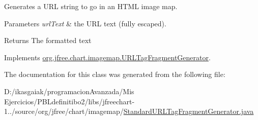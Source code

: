 Generates a U\+RL string to go in an H\+T\+ML image map.


\begin{DoxyParams}{Parameters}
{\em url\+Text} & the U\+RL text (fully escaped).\\
\hline
\end{DoxyParams}
\begin{DoxyReturn}{Returns}
The formatted text 
\end{DoxyReturn}


Implements \mbox{\hyperlink{interfaceorg_1_1jfree_1_1chart_1_1imagemap_1_1_u_r_l_tag_fragment_generator_aa69913b2f18cfa63c5641c0b10cb66bc}{org.\+jfree.\+chart.\+imagemap.\+U\+R\+L\+Tag\+Fragment\+Generator}}.



The documentation for this class was generated from the following file\+:\begin{DoxyCompactItemize}
\item 
D\+:/ikasgaiak/programacion\+Avanzada/\+Mis Ejercicios/\+P\+B\+Ldefinitibo2/libs/jfreechart-\/1../source/org/jfree/chart/imagemap/\mbox{\hyperlink{_standard_u_r_l_tag_fragment_generator_8java}{Standard\+U\+R\+L\+Tag\+Fragment\+Generator.\+java}}\end{DoxyCompactItemize}
